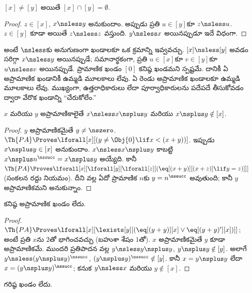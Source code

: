\documentclass[../../../include/open-logic-section]{subfiles}
\begin{document}
\begin{cor}
$[x]\neq[y]$ అయితే $[x]\cap[y]=\emptyset$.
\end{cor}

\begin{proof}
$z\in[x]$, $x\nsless y$ అనుకుందాం. అప్పుడు ప్రతి $u\in[y]$కూ
$z\nsless u$. $z\in[y]$ కూడా అయితే $z\nsless z$ వస్తుంది.
$y\nsless x$ అయినప్పుడూ ఇదే విధంగా.
\end{proof}

\begin{explain}
అంటే $\nsless$కు అనుగుణంగా ఖండాలకూ ఒక క్రమాన్ని ఇవ్వవచ్చు. $[x]\nsless[y]$ అవడం సరిగ్గా $x\nsless y$ అయినప్పుడే;
సమానార్థకంగా, ప్రతి $u\in[x]$కూ $v\in[y]$కూ $u\nsless v$
అయినప్పుడే. ప్రామాణిక ఖండం $[0]$ కనిష్ఠ ఖండమని స్పష్టమే. దానికీ ఏ అప్రామాణిక ఖండానికీ ఉమ్మడి మూలకాలు లేవు. ఏ రెండు
అప్రామాణిక ఖండాలకూ ఉమ్మడి మూలకాలు లేవు.
ముఖ్యంగా, ఉత్తరాధికారులు లేదా పూర్వాధికారులను పదేపదే తీసుకోవడం ద్వారా
వేరొక ఖండాన్ని “చేరుకోలేం.”
\end{explain}

\begin{prop}
$x$ మరియు $y$ అప్రామాణికాలైతే $x\nsless x\nsplus y$ మరియు
$x\nsplus y\notin[x]$.
\end{prop}

\begin{proof}
$y$ అప్రామాణికమైతే $y\neq\nszero$.
$\Th{PA}\Proves\lforall[x][(y\neq\Obj{0}\lif x<(x+y))]$.
ఇప్పుడు $x\nsplus y\in[x]$ అనుకుందాం. $x\nsless x\nsplus y$
కాబట్టి $x\nsplus n^\nssucc=x\nsplus y$ అయ్యేది. కానీ
$\Th{PA}\Proves\lforall[x][\lforall[y][\lforall[z][(
\eq[(x+y)][(x+z)]\lif y=z)]]]$ (సంకలన రద్దు నియమం). దీని వల్ల
ఏదో ప్రామాణిక $n$కు $y=n^\nssucc$ అవుతుంది; కానీ $y$ అప్రామాణికమని
అనుకున్నాం.
\end{proof}

\begin{prop}
కనిష్ఠ అప్రామాణిక ఖండం లేదు.
\end{prop}

\begin{proof}
$\Th{PA}\Proves\lforall[x][\lexists[y][(\eq[(y+y)][x]\lor
\eq[(y+y)'][x])]]$; అంటే ప్రతి $x$ను $2$తో భాగించవచ్చు
(బహుశా శేషం $1$తో). $x$ అప్రామాణికమైతే $y$ కూడా అప్రామాణికమే.
ముందరి ప్రతిపాదన వల్ల $y\nsless y\nsplus y$,
$y\nsplus y\notin[y]$. అలాగే
$y\nsless(y\nsplus y)^\nssucc$,
$(y\nsplus y)^\nssucc\notin[y]$. కానీ
$x=y\nsplus y$ లేదా $x=(y\nsplus y)^\nssucc$; కనుక
$y\nsless x$ మరియు $y\notin[x]$.
\end{proof}

\begin{prop}
గరిష్ఠ ఖండం లేదు.
\end{prop}
\end{document}
